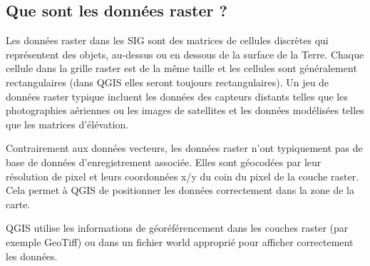 \subsection{Que sont les données raster ?}\label{label_whatsraster}

Les données raster dans les SIG sont des matrices de cellules discrètes qui
représentent des objets, au-dessus ou en dessous de la surface de la Terre.
Chaque cellule dans la grille raster est de la même taille et les cellules sont
généralement rectangulaires (dans QGIS elles seront toujours rectangulaires).
Un jeu de données raster typique incluent les données des capteurs distants
telles que les photographies aériennes ou les images de satellites et les
données modélisées telles que les matrices d'élévation.

Contrairement aux données vecteurs, les données raster n'ont typiquement pas de
base de données d'enregistrement associée. Elles sont géocodées par leur
résolution de pixel et leurs coordonnées x/y du coin du pixel de la couche
raster. Cela permet à QGIS de positionner les données correctement dans la zone
de la carte.

QGIS utilise les informations de géoréférencement dans les couches raster (par
exemple GeoTiff) ou dans un fichier world approprié pour afficher correctement
les données.

